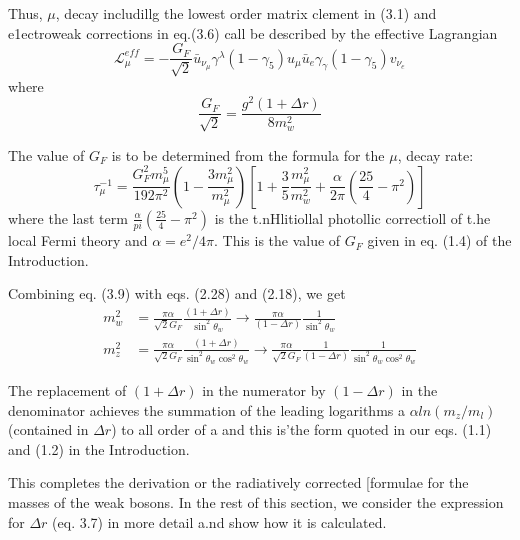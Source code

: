 {Thus, $\mu$, decay includillg the lowest order matrix clement in (3.1) and e1ectroweak
corrections in eq.(3.6) call be described by the effective Lagrangian 
\begin{equation*}
\mathcal{L}_{\mu}^{e f f}=-\frac{G_{F}}{\sqrt{2}}\bar{u}_{\nu_{\mu}}\gamma^{\lambda} (1-\gamma_{5})u_{\mu} \bar{u}_{e}\gamma_{\gamma}(1-\gamma_{5})v_{\nu_{e}}\tag{3.8}
\end{equation*}
where
\begin{equation*}
\frac{G_{F}}{\sqrt{2}} = \frac{g^{2}(1+\Delta r)}{8m^{2}_{w}}\tag{3.9}
\end{equation*}

The value of $G_{F}$ is to be determined from the formula for the $\mu$, decay rate: 
\begin{equation*}
\tau^{-1}_{\mu} =  \frac{G_{F}^{2}m_{\mu}^{5}}{192\pi^{2}} \left(1 - \frac{3m^{2}_{\mu}}{m^{2}_{\mu}}\right) \left[1 + \frac{3}{5}  \frac{m^{2}_{\mu}}{m^{2}_{w}}+ \frac{\alpha}{2\pi}\left(\frac{25}{4} - \pi^{2}\right)\right]\tag{3.10}
\end{equation*}
where the last term $\frac{\alpha}{pi}(\frac{25}{4} - \pi^{2})$ is the t.nHlitiollal photollic correctioll of t.he
local Fermi theory and $\alpha = e^{2}/4 \pi$. This is the value of $G_{F}$ given in eq. (1.4) of
the Introduction.

Combining eq. (3.9) with eqs. (2.28) and (2.18), we get 
\begin{align*}
m^{2}_{w} &= \frac{\pi \alpha}{\sqrt{2} G_{F}} \frac{(1+  \Delta r)}{\sin^{2} \theta_{w}} \rightarrow \frac{\pi \alpha}{(1- \Delta r)} \frac{1}{\sin^{2} \theta_{w}}\tag{3.11}\\
m^{2}_{z} &= \frac{\pi \alpha}{\sqrt{2} G_{F}} \frac{(1+ \Delta r)}{\sin^{2} \theta_{w} \cos^{2} \theta_{w}} \rightarrow  \frac{\pi  \alpha}{ \sqrt{2} G_{F}}\frac{1}{(1-\Delta r)}\frac{1}{\sin^{2} \theta_{w} \cos^{2}\theta_{w}}\tag{3.12}
\end{align*}

The replacement of $(1 + \Delta r)$ in the numerator by $(1 - \Delta r)$ in the denominator
achieves the summation of the leading logarithms a $\alpha ln(m_{z}/m_{l})$ (contained in
$\Delta r$) to all order of a and this is'the form quoted in our eqs. (1.1) and (1.2) in
the Introduction. 

This completes the derivation or the radiatively corrected [formulae for the
masses of the weak bosons. In the rest of this section, we consider the expression
for $\Delta r$ (eq. 3.7) in more detail a.nd show how it is calculated. 


}
